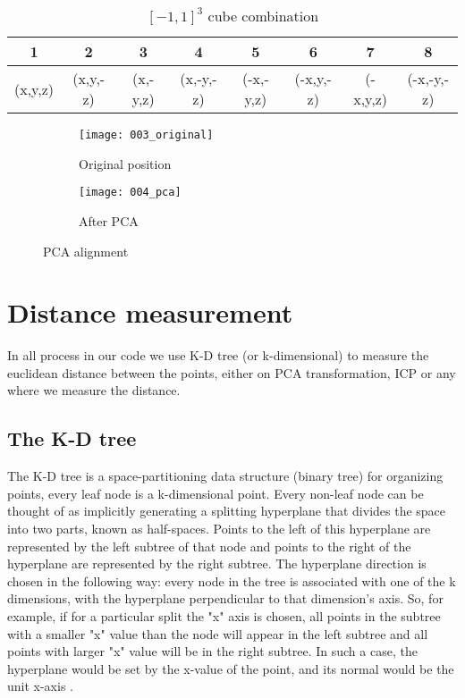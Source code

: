 \documentclass[../structure.tex]{subfiles}
\begin{document}
\begin{center}
\begin{table}[h]
	\begin{tabular}{| c | c | c | c | c | c | c | c |}
	\hline
	1 & 2 & 3 & 4 & 5 & 6 & 7 & 8\\
	\hline
	(x,y,z) & (x,y,-z) & (x,-y,z) & (x,-y,-z) & (-x,-y,z) & (-x,y,-z) & (-x,y,z) & (-x,-y,-z)\\
	\hline
	\end{tabular}
\caption{$[-1,1]^3$ cube combination}
\label{table:cube}
\end{table}
\end{center}

\begin{figure}[h]
	\centering
	\begin{subfigure}[b]{0.59\textwidth}
	\texttt{[image: 003\_original]}
	\caption{Original position}
	\end{subfigure}
	\begin{subfigure}[b]{0.39\textwidth}
	\texttt{[image: 004\_pca]}
	\caption{After PCA}
	\end{subfigure}
\label{fig:pca}
\caption{PCA alignment}
\end{figure}

\section{Distance measurement}
In all process in our code we use K-D tree (or k-dimensional)  to measure the euclidean distance between the points, either on PCA transformation, ICP or any where we measure the distance.
\subsection{The K-D tree} 
The K-D tree is a space-partitioning data structure (binary tree)  for organizing points, every leaf node is a k-dimensional point. Every non-leaf node can be thought of as implicitly generating a splitting hyperplane that divides the space into two parts, known as half-spaces. Points to the left of this hyperplane are represented by the left subtree of that node and points to the right of the hyperplane are represented by the right subtree. The hyperplane direction is chosen in the following way: every node in the tree is associated with one of the k dimensions, with the hyperplane perpendicular to that dimension's axis. So, for example, if for a particular split the "x" axis is chosen, all points in the subtree with a smaller "x" value than the node will appear in the left subtree and all points with larger "x" value will be in the right subtree. In such a case, the hyperplane would be set by the x-value of the point, and its normal would be the unit x-axis \cite{Bentley1975}.
\end{document}
